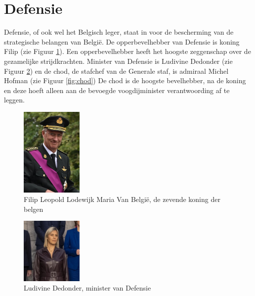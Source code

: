 
\section{Defensie}
\label{sec:defensie}

Defensie, of ook wel het Belgisch leger, staat in voor de bescherming van de strategische belangen van België. De opperbevelhebber van Defensie is koning Filip (zie Figuur \ref{fig:koning_filip}). Een opperbevelhebber heeft het hoogste zeggenschap over de gezamelijke strijdkrachten. Minister van Defensie is Ludivine Dedonder (zie Figuur \ref{fig:mod}) en de \gls{chod}, de stafchef van de Generale staf, is admiraal Michel Hofman (zie Figuur \ref{fig:chod}) De \gls{chod} is de hoogste bevelhebber, na de koning en deze hoeft alleen aan de bevoegde \gls{voogdijminister} verantwoording af te leggen.~\autocite{Wikipedia2022a}

\begin{figure}
    \includegraphics[width=3cm]{img/koning_filip.jpg}
    \caption{\label{fig:koning_filip}Filip Leopold Lodewijk Maria Van België, de zevende koning der belgen~\autocite{Wikipedia2022}}
\end{figure}

\begin{figure}
    \includegraphics[width=3cm]{img/Ludivine_Dedonder.jpg}
    \caption{\label{fig:mod}Ludivine Dedonder, minister van Defensie~\autocite{Wikipedia2022c}}
\end{figure}

